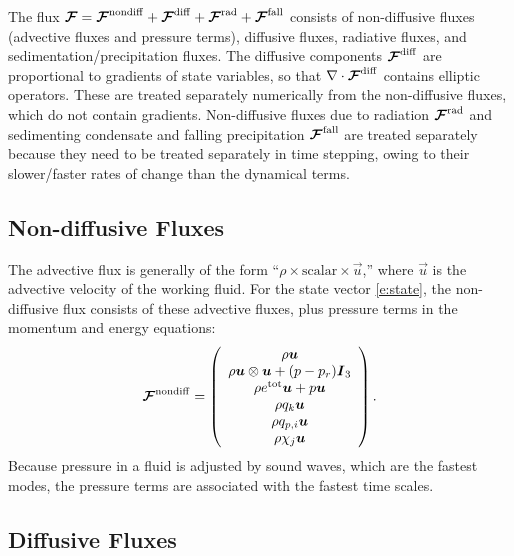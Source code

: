 \documentclass{report}
\begin{document}
The flux $\boldsymbol{{\mathcal{F}}}=\boldsymbol{{\mathcal{F}}}^{\mathrm{nondiff}} + \boldsymbol{{\mathcal{F}}}^{\mathrm{diff}} + \boldsymbol{{\mathcal{F}}}^{\mathrm{rad}} + \boldsymbol{{\mathcal{F}}}^{\mathrm{fall}}$ consists of non-diffusive fluxes (advective fluxes and pressure terms), diffusive fluxes, radiative fluxes, and sedimentation/precipitation fluxes. The diffusive components $\boldsymbol{{\mathcal{F}}}^{\mathrm{diff}}$ are proportional to gradients of state variables, so that $\nabla \cdot \boldsymbol{{\mathcal{F}}}^{\mathrm{diff}}$ contains elliptic operators. These are treated separately numerically from the non-diffusive fluxes, which do not contain gradients. Non-diffusive fluxes due to radiation $\boldsymbol{{\mathcal{F}}}^{\mathrm{rad}}$ and sedimenting condensate and falling precipitation $\boldsymbol{{\mathcal{F}}}^{\mathrm{fall}}$ are treated separately because they need to be treated separately in time stepping, owing to their slower/faster rates of change than the dynamical terms. 

\subsection{Non-diffusive Fluxes}

The advective flux is generally of the form ``$\rho \times \mathrm{scalar} \times \vec{u}$,'' where $\vec{u}$ is the advective velocity of the working fluid. For the state vector \eqref{e:state}, the non-diffusive flux consists of these advective fluxes, plus pressure terms in the momentum and energy equations: 
 \begin{equation}
 \label{e:adv_flux}
 \boldsymbol{{\mathcal{F}}}^{\mathrm{nondiff}}=\left( \begin{array}{c}
 \rho \boldsymbol{{u}} \\
 \rho \boldsymbol{{u}} \otimes \boldsymbol{{u}} + (p - p_r) \boldsymbol{{I}}_3 \\
 \rho e^{\mathrm{tot}} \boldsymbol{{u}} + p \boldsymbol{{u}}\\
 \rho q_k \boldsymbol{{u}}\\
 \rho q_{p,i} \boldsymbol{{u}} \\
 \rho \chi_j \boldsymbol{{u}}
\end{array}
\right).
 \end{equation}
Because pressure in a fluid is adjusted by sound waves, which are the fastest modes, the pressure terms are associated with the fastest time scales. 

\subsection{Diffusive Fluxes}
\end{document}
